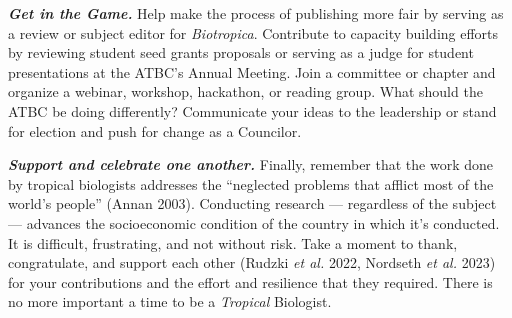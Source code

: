 \documentclass[
  12pt,
  man, donotrepeattitle,floatsintext]{apa6}
\begin{document}
\textbf{\emph{Get in the Game.}} Help make the process of publishing more fair by serving as a review or subject editor for \emph{Biotropica}. Contribute to capacity building efforts by reviewing student seed grants proposals or serving as a judge for student presentations at the ATBC's Annual Meeting. Join a committee or chapter and organize a webinar, workshop, hackathon, or reading group. What should the ATBC be doing differently? Communicate your ideas to the leadership or stand for election and push for change as a Councilor.

\textbf{\emph{Support and celebrate one another.}} Finally, remember that the work done by tropical biologists addresses the ``neglected problems that afflict most of the world's people'' (Annan 2003). Conducting research --- regardless of the subject --- advances the socioeconomic condition of the country in which it's conducted. It is difficult, frustrating, and not without risk. Take a moment to thank, congratulate, and support each other (Rudzki \emph{et al.} 2022, Nordseth \emph{et al.} 2023) for your contributions and the effort and resilience that they required. There is no more important a time to be a \emph{Tropical} Biologist.

\newpage
\end{document}
